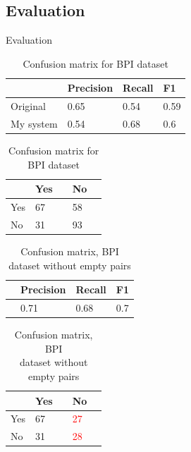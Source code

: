 \documentclass{beamer}
\begin{document}
\subsection{Evaluation}
\begin{frame}{Evaluation}
    \begin{table}[!htb]
    \begin{minipage}{0.7\linewidth}
        \caption{Evaluation on BPI dataset}
        \label{table:bpi-eval}
        \begin{tabular}{llll}
             & Precision & Recall & F1 \\ \hline
            Original & 0.65  & 0.54 & 0.59  \\ \hline
            My system & 0.54 & 0.68 & 0.6 \\
        \end{tabular}
    \end{minipage}%
    \begin{minipage}{0.3\linewidth}
        \centering
        \caption{Confusion matrix for BPI dataset}
        \label{table:bpi-matrix}
        \begin{tabular}{l|llll}
            & Yes &  & No &  \\ \hline
            Yes & 67 &  & 58 &  \\
            No & 31 &  & 93 & 
        \end{tabular}
    \end{minipage}
\end{table}
\begin{table}[!htb]
    \begin{minipage}{.5\linewidth}
        \caption{Evaluation BPI\\ dataset without empty pairs}
        \label{table:bpi-matrix-non-empty}
        \begin{tabular}{llll}
             & Precision & Recall & F1 \\ \hline
             & 0.71 & 0.68 & 0.7 \\
        \end{tabular}
    \end{minipage}%
    \begin{minipage}{.5\linewidth}
        \centering
        \caption{Confusion matrix, BPI\\ dataset without empty pairs}
        \label{table:bpi-eval-non-empty}
        \begin{tabular}{l|llll}
            & Yes &  & No &  \\ \hline
            Yes & 67 &  & \textcolor{red}{27} &  \\
            No & 31 &  & \textcolor{red}{28} & 
        \end{tabular}
    \end{minipage} 
\end{table}
\end{frame}
\end{document}
